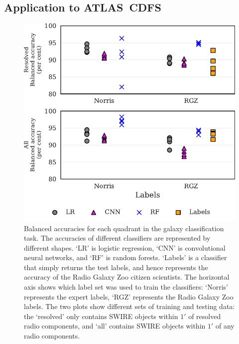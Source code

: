 \documentclass[fleqn,usenatbib,usedcolumn]{mnras}
\begin{document}
  \subsection{Application to ATLAS~CDFS}

    \begin{figure}
    \centering
    \includegraphics[width=\columnwidth]{images/cdfs_ba_grid.pdf}
    \caption{Balanced accuracies for each quadrant in the galaxy
      classification task. The accuracies of different classifiers are
      represented by different shapes. `LR' is logistic regression, `CNN' is
      convolutional neural networks, and `RF' is random forests. `Labels' is a
      classifier that simply returns the test labels, and hence represents the
      accuracy of the Radio Galaxy Zoo citizen scientists. The horizontal axis
      shows which label set was used to train the classifiers: `Norris'
      represents the expert labels, `RGZ' represents the Radio Galaxy Zoo
      labels. The two plots show different sets of training and testing data:
      the `resolved' only contains SWIRE objects within $1'$ of resolved radio
      components, and `all' contains SWIRE objects within $1'$ of any radio
      components.
      \label{fig:ba}}
    \end{figure}
\end{document}
